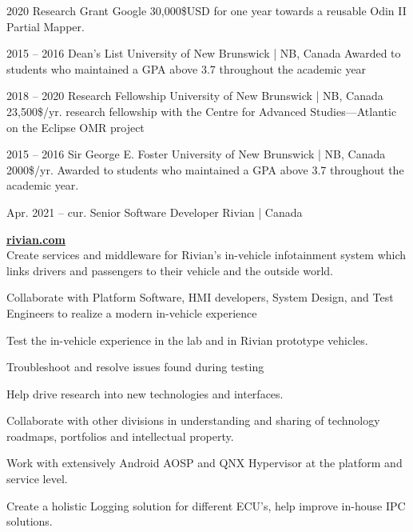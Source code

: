 \documentclass{developercv} %
\begin{document}

\entrys
{2020}
{Research Grant}
{Google}
{30,000\$USD for one year towards a reusable Odin II Partial Mapper.\footnotemark}


\entrys
{2015 -- 2016}
{Dean's List}
{University of New Brunswick | NB, Canada}
{Awarded to students who maintained a GPA above 3.7 throughout the academic year}


\entrys
{2018 -- 2020}
{Research Fellowship}
{University of New Brunswick | NB, Canada}
{23,500\$/yr. research fellowship  with the Centre for Advanced Studies---Atlantic on the Eclipse OMR project}

\entrys
{2015 -- 2016}
{Sir George E. Foster}
{University of New Brunswick | NB, Canada}
{2000\$/yr. Awarded to students who maintained a GPA above 3.7 throughout the academic year.}


\entrys
{Apr. 2021 -- cur.}
{Senior Software Developer}
{Rivian | Canada}{
	\textbf{\href{https://rivian.com/}{rivian.com}}\\
	Create services and middleware for Rivian’s in-vehicle infotainment system which links drivers and passengers to their vehicle and the outside world.
	\begin{tightemize}
		\item Collaborate with Platform Software, HMI developers, System Design, and Test Engineers to realize a modern in-vehicle experience
		\item Test the in-vehicle experience in the lab and in Rivian prototype vehicles.
		\item Troubleshoot and resolve issues found during testing
		\item Help drive research into new technologies and interfaces.
		\item Collaborate with other divisions in understanding and sharing of technology roadmaps, portfolios and intellectual property.
		\item Work with extensively Android AOSP and QNX Hypervisor at the platform and service level.
		\item Create a holistic Logging solution for different ECU's, help improve in-house IPC solutions.
	\end{tightemize}

}
\end{document}
